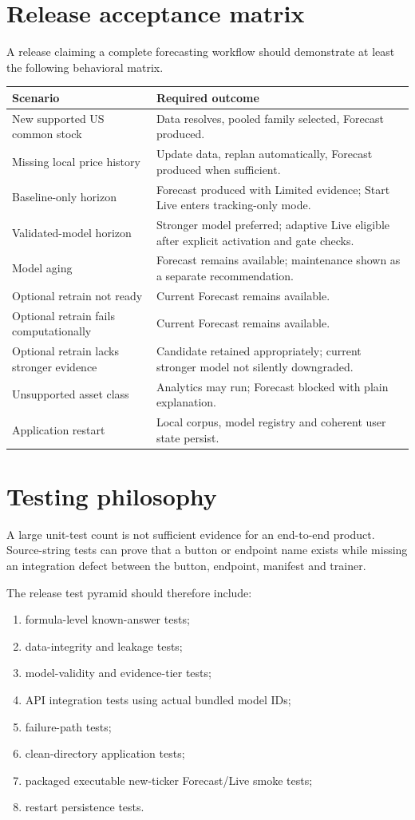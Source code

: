 \documentclass[11pt]{article}
\begin{document}
\section{Release acceptance matrix}
A release claiming a complete forecasting workflow should demonstrate at least the following behavioral matrix.
\begin{longtable}{p{}p{}}
\toprule
Scenario & Required outcome\\
\midrule
\endhead
New supported US common stock & Data resolves, pooled family selected, Forecast produced.\\
Missing local price history & Update data, replan automatically, Forecast produced when sufficient.\\
Baseline-only horizon & Forecast produced with Limited evidence; Start Live enters tracking-only mode.\\
Validated-model horizon & Stronger model preferred; adaptive Live eligible after explicit activation and gate checks.\\
Model aging & Forecast remains available; maintenance shown as a separate recommendation.\\
Optional retrain not ready & Current Forecast remains available.\\
Optional retrain fails computationally & Current Forecast remains available.\\
Optional retrain lacks stronger evidence & Candidate retained appropriately; current stronger model not silently downgraded.\\
Unsupported asset class & Analytics may run; Forecast blocked with plain explanation.\\
Application restart & Local corpus, model registry and coherent user state persist.\\
\bottomrule
\end{longtable}

\section{Testing philosophy}
A large unit-test count is not sufficient evidence for an end-to-end product. Source-string tests can prove that a button or endpoint name exists while missing an integration defect between the button, endpoint, manifest and trainer.

The release test pyramid should therefore include:
\begin{enumerate}[itemsep=0.2em]
\item formula-level known-answer tests;
\item data-integrity and leakage tests;
\item model-validity and evidence-tier tests;
\item API integration tests using actual bundled model IDs;
\item failure-path tests;
\item clean-directory application tests;
\item packaged executable new-ticker Forecast/Live smoke tests;
\item restart persistence tests.
\end{enumerate}
\end{document}
